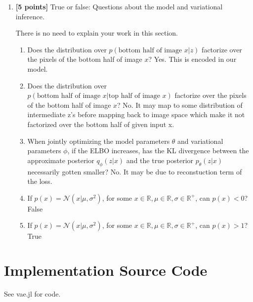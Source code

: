 \documentclass{article}
\begin{document}
\begin{enumerate}[label=(\alph*)]
	\item {\bf [5 points]} True or false: Questions about the model and variational inference.
	
	There is no need to explain your work in this section.

\begin{enumerate}[label=(\alph*)]
	\item Does the distribution over $p(\text{bottom half of image $x$} | z)$ factorize over the pixels of the bottom half of image $x$? Yes. This is encoded in our model.
	\item Does the distribution over $p(\text{bottom half of image $x$} | \text{top half of image $x$})$ factorize over the pixels of the bottom half of image $x$? No. It may map to some distribution of intermediate z's before mapping back to image space which make it not factorized over the bottom half of given input x.
	\item When jointly optimizing the model parameters $\theta$ and variational parameters $\phi$, if the ELBO increases, has the KL divergence between the approximate posterior $q_\phi(z|x)$ and the true posterior $p_\theta(z|x)$ necessarily gotten smaller? No. It may be due to reconstuction term of the loss.
	\item If $p(x) = \mathcal{N}(x | \mu, \sigma^2)$, for some $x \in \mathbb{R}, \mu \in \mathbb{R}, \sigma \in \mathbb{R}^+$, can $p(x) < 0$? False
	\item If $p(x) = \mathcal{N}(x | \mu, \sigma^2)$, for some $x \in \mathbb{R}, \mu \in \mathbb{R}, \sigma \in \mathbb{R}^+$, can $p(x) > 1$? True
\end{enumerate}
  
\end{enumerate}

\section{Implementation Source Code}
See vae.jl for code.
\end{document}
